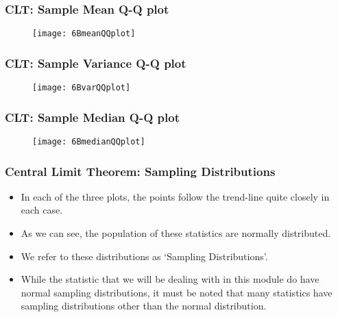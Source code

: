 \documentclass[a4]{beamer}
\begin{document}
\begin{frame}
\frametitle{CLT: Sample Mean Q-Q plot}
\begin{figure}
  \texttt{[image: 6BmeanQQplot]}\\

\end{figure}

\end{frame}
\begin{frame}
\frametitle{CLT: Sample Variance Q-Q plot}
\begin{figure}
  \texttt{[image: 6BvarQQplot]}\\

\end{figure}

\end{frame}
\begin{frame}
\frametitle{CLT: Sample Median Q-Q plot}
\begin{figure}
  \texttt{[image: 6BmedianQQplot]}\\

\end{figure}
\end{frame}
\begin{frame}
\frametitle{Central Limit Theorem: Sampling Distributions}
\begin{itemize}
\item In each of the three plots, the points follow the trend-line quite closely in each case.
\item As we can see, the population of these statistics are normally distributed.
\item We refer to these distributions as `Sampling Distributions'.
\item While the statistic that we will be dealing with in this module do have normal sampling distributions, it must be noted that many statistics have sampling distributions other than the normal distribution.
\end{itemize}
\end{frame}
\end{document}

